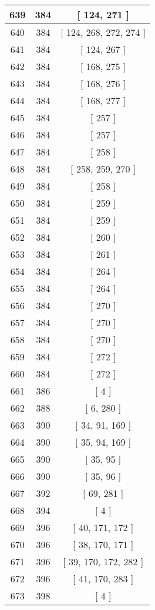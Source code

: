 \begin{center}
\begin{longtable}[H]{|| c c c ||}
\hline
639 & 384 & [ 124, 271 ] \\ 
\hline
640 & 384 & [ 124, 268, 272, 274 ] \\ 
\hline
641 & 384 & [ 124, 267 ] \\ 
\hline
642 & 384 & [ 168, 275 ] \\ 
\hline
643 & 384 & [ 168, 276 ] \\ 
\hline
644 & 384 & [ 168, 277 ] \\ 
\hline
645 & 384 & [ 257 ] \\ 
\hline
646 & 384 & [ 257 ] \\ 
\hline
647 & 384 & [ 258 ] \\ 
\hline
648 & 384 & [ 258, 259, 270 ] \\ 
\hline
649 & 384 & [ 258 ] \\ 
\hline
650 & 384 & [ 259 ] \\ 
\hline
651 & 384 & [ 259 ] \\ 
\hline
652 & 384 & [ 260 ] \\ 
\hline
653 & 384 & [ 261 ] \\ 
\hline
654 & 384 & [ 264 ] \\ 
\hline
655 & 384 & [ 264 ] \\ 
\hline
656 & 384 & [ 270 ] \\ 
\hline
657 & 384 & [ 270 ] \\ 
\hline
658 & 384 & [ 270 ] \\ 
\hline
659 & 384 & [ 272 ] \\ 
\hline
660 & 384 & [ 272 ] \\ 
\hline
661 & 386 & [ 4 ] \\ 
\hline
662 & 388 & [ 6, 280 ] \\ 
\hline
663 & 390 & [ 34, 91, 169 ] \\ 
\hline
664 & 390 & [ 35, 94, 169 ] \\ 
\hline
665 & 390 & [ 35, 95 ] \\ 
\hline
666 & 390 & [ 35, 96 ] \\ 
\hline
667 & 392 & [ 69, 281 ] \\ 
\hline
668 & 394 & [ 4 ] \\ 
\hline
669 & 396 & [ 40, 171, 172 ] \\ 
\hline
670 & 396 & [ 38, 170, 171 ] \\ 
\hline
671 & 396 & [ 39, 170, 172, 282 ] \\ 
\hline
672 & 396 & [ 41, 170, 283 ] \\ 
\hline
673 & 398 & [ 4 ] \\ 
\hline

\end{longtable}
\end{center}
